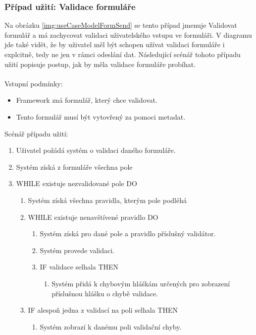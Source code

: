 \subsubsection{Případ užití: Validace formuláře}
Na obrázku \ref{img:useCaseModelFormSend} se tento případ jmenuje Validovat formulář a má zachycovat validaci uživatelského vstupu ve formuláři. V diagramu jde také vidět, že by uživatel měl být schopen užívat validaci formuláře i explcitně, tedy ne jen v rámci odeslání dat. Následující scénář tohoto případu užití popisuje postup, jak by měla validace formuláře probíhat.\\\\
Vstupní podmínky:
\begin{itemize}
\item Framework zná formulář, který chce validovat. 
\item Tento formulář musí být vytovřený za pomoci metadat.
\end{itemize}
Scénář případu užití:
\begin{enumerate}
\item Uživatel požádá systém o validaci daného formuláře.
\item Systém získá z formuláře všechna pole
\item WHILE existuje nezvalidované pole DO
\begin{enumerate}
\item Systém získá všechna pravidla, kterým pole podléhá
\item WHILE existuje nenavštívené pravidlo DO
\begin{enumerate}
\item Systém získá pro dané pole a pravidlo příslušný validátor.
\item Systém provede validaci.
\item IF validace selhala THEN
\begin{enumerate}
\item Systém přidá k chybovým hláškám určených pro zobrazení příslušnou hlášku o chybě validace.
\end{enumerate}
\end{enumerate}
\item IF alespoň jedna z validací na poli selhala THEN
\begin{enumerate}
\item Systém zobrazí k danému poli validační chyby.
\end{enumerate}
\end{enumerate} 
\end{enumerate}

